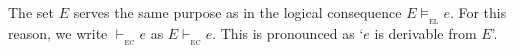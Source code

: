 \documentclass[a4paper,fleqn]{article}
\newenvironment{derivation}
{\par\addtolength{\baselineskip}{1mm}\begin{tabbing}\hspace{5mm}\=\hspace{5mm}\=\hspace{5mm}\=\kill}
{\end{tabbing}\par}
\newcommand{\expr}[1]{\>\>$#1$}
\newcommand{\tran}[2]{\\*\>$#1$\>\>\{ #2 \}\\}
\newtheorem{ththeorem}[thdefinition]{Theorem}
\newenvironment{theorem}
  {\begin{ththeorem}\em}
  {\end{ththeorem}}
\newtheorem{thremark}[thdefinition]{Remark}
\newenvironment{remark}
  {\begin{thremark}\em}
  {\end{thremark}}
\newcommand{\frm}[1]{\mbox{\ensuremath{#1}}}
\newcommand{\f}[1]{\ensuremath{\mathit{#1}}}
\newcommand{\fa}[2]{\ensuremath{\f{#1}(#2)}}
\newcommand{\derivable}[1]{\ensuremath{\vdash_{_{#1}}}}
\newcommand{\valid}[1]{\ensuremath{\models_{_{#1}}}}
\newcommand{\termv}[2]{\ensuremath{\f{T}_{\fa{#1}{#2}}}}
\newcommand{\vEL}{\ensuremath{\valid{\mathrm{EL}}}}
\newcommand{\dEC}{\ensuremath{\derivable{\mathrm{EC}}}}
\newlength{\tlength}
\begin{document}
\setlength{\extrarowheight}{0mm}
\setlength{\mathindent}{10mm}

\noindent
The set \frm{E} serves the same purpose as in the logical consequence \frm{E \vEL e}. For this reason, we write \frm{\dEC e} as \frm{E \dEC e}. This is pronounced as `\frm{e} is derivable from \frm{E}'.

%
%
%
%
%
%
\end{document}
